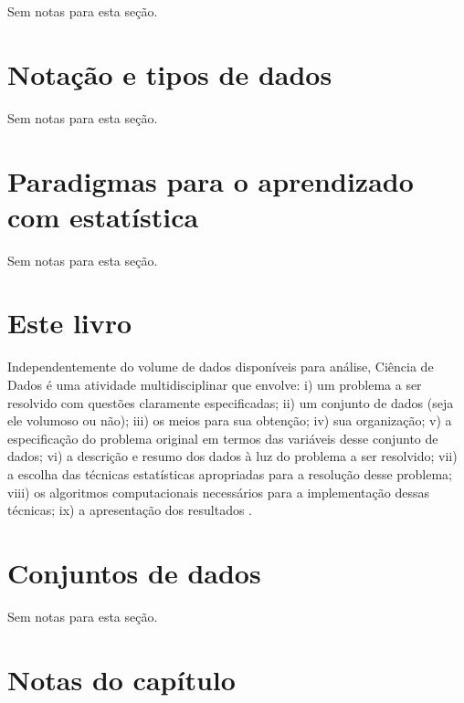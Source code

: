 \documentclass[
]{latex/krantz}
\renewenvironment{quote}{\begin{VF}}{\end{VF}}
\theoremstyle{definition}
\theoremstyle{definition}
\theoremstyle{definition}
\theoremstyle{definition}
\theoremstyle{remark}
\begin{document}
Sem notas para esta seção.

\hypertarget{notauxe7uxe3o-e-tipos-de-dados}{%
\section{Notação e tipos de dados}\label{notauxe7uxe3o-e-tipos-de-dados}}

Sem notas para esta seção.

\hypertarget{paradigmas-para-o-aprendizado-com-estatuxedstica}{%
\section{Paradigmas para o aprendizado com estatística}\label{paradigmas-para-o-aprendizado-com-estatuxedstica}}

Sem notas para esta seção.

\hypertarget{este-livro}{%
\section{Este livro}\label{este-livro}}

\begin{quote}
Independentemente do volume de dados disponíveis para análise, Ciência de Dados é uma atividade multidisciplinar que envolve: i) um problema a ser resolvido com questões claramente especificadas; ii) um conjunto de dados (seja ele volumoso ou não); iii) os meios para sua obtenção; iv) sua organização; v) a especificação do problema original em termos das variáveis desse conjunto de dados; vi) a descrição e resumo dos dados à luz do problema a ser resolvido; vii) a escolha das técnicas estatísticas apropriadas para a resolução desse problema; viii) os algoritmos computacionais necessários para a implementação dessas técnicas; ix) a apresentação dos resultados \citep[p.~11]{MorettinSinger2022}.
\end{quote}

\hypertarget{conjuntos-de-dados}{%
\section{Conjuntos de dados}\label{conjuntos-de-dados}}

Sem notas para esta seção.

\hypertarget{notas-do-capuxedtulo}{%
\section{Notas do capítulo}\label{notas-do-capuxedtulo}}
\end{document}
